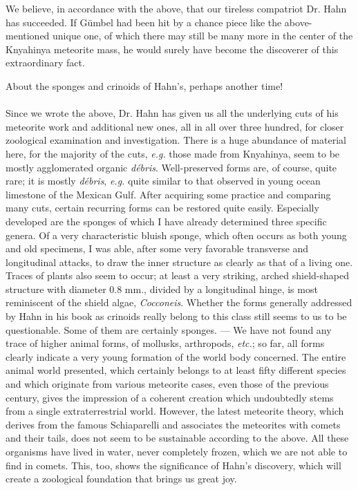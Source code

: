 \documentclass[a4paper, 12pt, oneside]{article}
\begin{document}
We believe, in accordance with the above, that our tireless compatriot Dr. Hahn has succeeded. If Gümbel had been hit by a chance piece like the above-mentioned unique one, of which there may still be many more in the center of the Knyahinya meteorite mass, he would surely have become the discoverer of this extraordinary fact.

About the sponges and crinoids of Hahn's, perhaps another time!

%
\textbigcircle%
%

\paragraph*{}
Since we wrote the above, Dr. Hahn has given us all the underlying cuts of his meteorite work and additional new ones, all in all over three hundred, for closer zoological examination and investigation. There is a huge abundance of material here, for the majority of the cuts, \emph{e.g.} those made from Knyahinya, seem to be mostly agglomerated organic \emph{débris}. Well-preserved forms are, of course, quite rare; it is mostly \emph{débris}, \emph{e.g.} quite similar to that observed in young ocean limestone of the Mexican Gulf. After acquiring some practice and comparing many cuts, certain recurring forms can be restored quite easily. Especially developed are the sponges of which I have already determined three specific genera. Of a very characteristic bluish sponge, which often occurs as both young and old specimens, I was able, after some very favorable transverse and longitudinal attacks, to draw the inner structure as clearly as that of a living one. Traces of plants also seem to occur; at least a very striking, arched shield-shaped structure with diameter 0.8 mm., divided by a longitudinal hinge, is most reminiscent of the shield algae, \emph{Cocconeis}. Whether the forms generally addressed by Hahn in his book as crinoids really belong to this class still seems to us to be questionable. Some of them are certainly sponges. --- We have not found any trace of higher animal forms, of mollusks, arthropods, \emph{etc.}; so far, all forms clearly indicate a very young formation of the world body concerned. The entire animal world presented, which certainly belongs to at least fifty different species and which originate from various meteorite cases, even those of the previous century, gives the impression of a coherent creation which undoubtedly stems from a single extraterrestrial world. However, the latest meteorite theory, which derives from the famous Schiaparelli and associates the meteorites with comets and their tails, does not seem to be sustainable according to the above. All these organisms have lived in water, never completely frozen, which we are not able to find in comets. This, too, shows the significance of Hahn's discovery, which will create a zoological foundation that brings us great joy.
\clearpage
\end{document}
